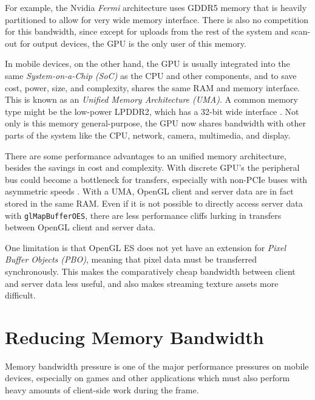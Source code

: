 For example, the Nvidia \textit{Fermi} architecture uses GDDR5 memory that is heavily partitioned \cite{Walton10} to allow for very wide memory interface.  There is also no competition for this bandwidth, since except for uploads from the rest of the system and scan-out for output devices, the GPU is the only user of this memory.


In mobile devices, on the other hand, the GPU is usually integrated into the same \textit{System-on-a-Chip (SoC)} as the CPU and other components, and to save cost, power, size, and complexity, shares the same RAM and memory interface.  This is known as an \textit{Unified Memory Architecture (UMA)}.  A common memory type might be the low-power LPDDR2, which has a 32-bit wide interface \cite{anandtech_lg_optimus}.  Not only is this memory general-purpose, the GPU now shares bandwidth with other parts of the system like the CPU, network, camera, multimedia, and display.   


There are some performance advantages to an unified memory architecture, besides the savings in cost and complexity.  With discrete GPU's the peripheral bus could become a bottleneck for transfers, especially with non-PCIe buses with asymmetric speeds \cite{Elhasson}.  With a UMA, OpenGL client and server data are in fact stored in the same RAM.  Even if it is not possible to directly access server data with \texttt{glMapBufferOES}, there are less performance cliffs lurking in transfers between OpenGL client and server data.


One limitation is that OpenGL ES does not yet have an extension for \textit{Pixel Buffer Objects (PBO)}, meaning that pixel data must be transferred synchronously.  This makes the comparatively cheap bandwidth between client and server data less useful, and also makes streaming texture assets more difficult.

\section{Reducing Memory Bandwidth}\label{Jon-McCaffrey:differences-in-memory-architecture}


Memory bandwidth pressure is one of the major performance pressures on mobile devices, especially on games and other applications which must also perform heavy amounts of client-side work during the frame.

